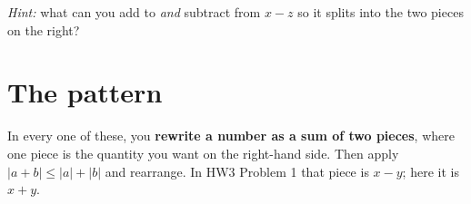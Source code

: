 \documentclass[11pt]{article}
\begin{document}
\emph{Hint:} what can you add to \emph{and} subtract from $x-z$ so it
splits into the two pieces on the right?

\vspace{3cm}

\section*{The pattern}
In every one of these, you \textbf{rewrite a number as a sum of two
pieces}, where one piece is the quantity you want on the right-hand side.
Then apply $|a+b|\le|a|+|b|$ and rearrange. In HW3 Problem 1 that piece is
$x-y$; here it is $x+y$.
\end{document}
